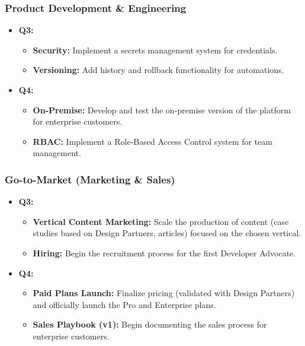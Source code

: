 \documentclass[11pt, a4paper, oneside]{article}
\begin{document}
\subsubsection*{Product Development \& Engineering}
\begin{itemize}[leftmargin=*]
    \item \textbf{Q3:}
    \begin{itemize}
        \item \textbf{Security:} Implement a secrets management system for credentials.
        \item \textbf{Versioning:} Add history and rollback functionality for automations.
    \end{itemize}
    \item \textbf{Q4:}
    \begin{itemize}
        \item \textbf{On-Premise:} Develop and test the on-premise version of the platform for enterprise customers.
        \item \textbf{RBAC:} Implement a Role-Based Access Control system for team management.
    \end{itemize}
\end{itemize}

\subsubsection*{Go-to-Market (Marketing \& Sales)}
\begin{itemize}[leftmargin=*]
    \item \textbf{Q3:}
    \begin{itemize}
        \item \textbf{Vertical Content Marketing:} Scale the production of content (case studies based on Design Partners, articles) focused on the chosen vertical.
        \item \textbf{Hiring:} Begin the recruitment process for the first Developer Advocate.
    \end{itemize}
    \item \textbf{Q4:}
    \begin{itemize}
        \item \textbf{Paid Plans Launch:} Finalize pricing (validated with Design Partners) and officially launch the Pro and Enterprise plans.
        \item \textbf{Sales Playbook (v1):} Begin documenting the sales process for enterprise customers.
    \end{itemize}
\end{itemize}
\end{document}
